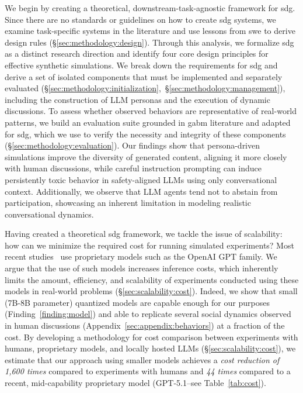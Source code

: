 We begin by creating a theoretical, downstream-task-agnostic framework for \ac{sdg}. Since there are no standards or guidelines on how to create \ac{sdg} systems, we examine task-specific systems in the literature and use lessons from \acf{swe} to derive design rules (\S\ref{sec:methodology:design}). Through this analysis, we formalize \acf{sdg} as a distinct research direction and identify four core design principles for effective synthetic simulations. We break down the requirements for \ac{sdg} and derive a set of isolated components that must be implemented and separately evaluated (\S\ref{sec:methodology:initialization},~\S\ref{sec:methodology:management}), including the construction of LLM personas and the execution of dynamic discussions. To assess whether observed behaviors are representative of real-world patterns, we build an evaluation suite grounded in \ac{gabm} literature and adapted for \ac{sdg}, which we use to verify the necessity and integrity of these components (\S\ref{sec:methodology:evaluation}). Our findings show that persona-driven simulations improve the diversity of generated content, aligning it more closely with human discussions, while careful instruction prompting can induce persistently toxic behavior in safety-aligned LLMs using only conversational context. Additionally, we observe that LLM agents tend not to abstain from participation, showcasing an inherent limitation in modeling realistic conversational dynamics.

Having created a theoretical \ac{sdg} framework, we tackle the issue of scalability: how can we minimize the required cost for running simulated experiments? Most recent studies~\cite{abdelnabi_negotiations, park_simulacra, park_2023_game, balog_2024, tornberg_2023} use proprietary models such as the OpenAI GPT family. We argue that the use of such models increases inference costs, which inherently limits the amount, efficiency, and scalability of experiments conducted using these models in real-world problems (\S\ref{sec:scalability:cost}). Indeed, we show that small (7B-8B parameter) quantized models are capable enough for our purposes (Finding~\ref{finding:model}) and able to replicate several social dynamics observed in human discussions (Appendix~\ref{sec:appendix:behaviors}) at a fraction of the cost. By developing a methodology for cost comparison between experiments with humans, proprietary models, and locally hosted LLMs (\S\ref{sec:scalability:cost}), we estimate that our approach using smaller models achieves a \emph{cost reduction of 1,600 times} compared to experiments with humans and \emph{44 times} compared to a recent, mid-capability proprietary model (GPT-5.1--see Table~\ref{tab:cost}).

